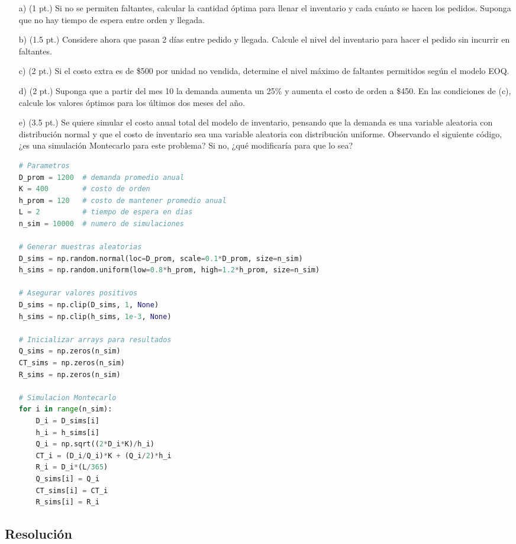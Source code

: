 \documentclass[12pt]{article}
\begin{document}
\begin{itemize}
    \item[a)] (1 pt.) Si no se permiten faltantes, calcular la cantidad óptima para llenar el inventario y cada cuánto se hacen los pedidos. Suponga que no hay tiempo de espera entre orden y llegada.
    \item[b)] (1.5 pt.) Considere ahora que pasan 2 días entre pedido y llegada. Calcule el nivel del inventario para hacer el pedido sin incurrir en faltantes.
    \item[c)] (2 pt.) Si el costo extra es de \$500 por unidad no vendida, determine el nivel máximo de faltantes permitidos según el modelo EOQ.
    \item[d)] (2 pt.) Suponga que a partir del mes 10 la demanda aumenta un 25\% y aumenta el costo de orden a \$450. En las condiciones de (c), calcule los valores óptimos para los últimos dos meses del año.
    \item[e)] (3.5 pt.) Se quiere simular el costo anual total del modelo de inventario, pensando que la demanda es una variable aleatoria con distribución normal y que el costo de inventario sea una variable aleatoria con distribución uniforme. Observando el siguiente código, ¿es una simulación Montecarlo para este problema? Si no, ¿qué modificaría para que lo sea?
\begin{lstlisting}[language=Python]
# Parametros
D_prom = 1200  # demanda promedio anual
K = 400        # costo de orden
h_prom = 120   # costo de mantener promedio anual
L = 2          # tiempo de espera en dias
n_sim = 10000  # numero de simulaciones

# Generar muestras aleatorias
D_sims = np.random.normal(loc=D_prom, scale=0.1*D_prom, size=n_sim)
h_sims = np.random.uniform(low=0.8*h_prom, high=1.2*h_prom, size=n_sim)

# Asegurar valores positivos
D_sims = np.clip(D_sims, 1, None)
h_sims = np.clip(h_sims, 1e-3, None)

# Inicializar arrays para resultados
Q_sims = np.zeros(n_sim)
CT_sims = np.zeros(n_sim)
R_sims = np.zeros(n_sim)

# Simulacion Montecarlo
for i in range(n_sim):
    D_i = D_sims[i]
    h_i = h_sims[i]
    Q_i = np.sqrt((2*D_i*K)/h_i)
    CT_i = (D_i/Q_i)*K + (Q_i/2)*h_i
    R_i = D_i*(L/365)
    Q_sims[i] = Q_i
    CT_sims[i] = CT_i
    R_sims[i] = R_i
\end{lstlisting}
\end{itemize}

\subsection{Resolución}
\end{document}

